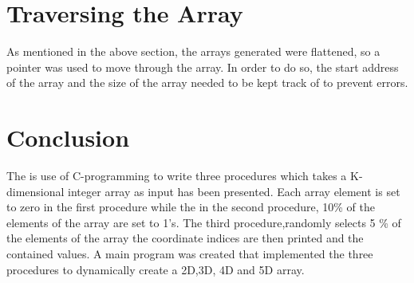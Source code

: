 \documentclass[10pt,a4paper]{article}
\begin{document}
\section{Traversing the Array}
As mentioned in the above section, the arrays generated were flattened, so a pointer was used to move through the array. In order to do so, the start address of the array and the size of the array needed to be kept track of to prevent errors.
\section{Conclusion}
The is use of C-programming to write three procedures which takes a K-dimensional integer array as input has been presented. Each array element is set to zero in the first procedure while the in the second procedure, 10\% of the elements of the array are set to 1's. The third procedure,randomly selects 5 \% of the elements of the array the coordinate indices are then printed and the contained values. A main program was created that implemented the three procedures to dynamically create a 2D,3D, 4D and 5D array. 
\end{document}
